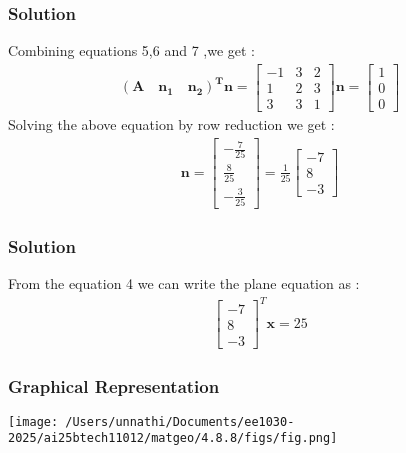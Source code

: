 \documentclass{beamer}
\begin{document}
\begin{frame}
\frametitle{Solution}
Combining equations 5,6 and 7 ,we get :
\begin{align}
    \mathbf{(A\quad n_1\quad n_2)^{T}}\textbf{n} = \begin{bmatrix}-1 & 3& 2\\
                                                      1 & 2 & 3\\
                                                      3 & 3& 1\end{bmatrix}\textbf{n} = \begin{bmatrix}1\\0\\0\end{bmatrix}
\end{align}
Solving the above equation by row reduction we get :
\begin{align}
    \textbf{n} = \begin{bmatrix}-\frac{7}{25} \\ \frac{8}{25} \\ -\frac{3}{25}\end{bmatrix} = \frac{1}{25}\begin{bmatrix}-7\\8\\-3\end{bmatrix}
\end{align}

\end{frame}

\begin{frame}
\frametitle{Solution}
From the equation 4 we can write the plane equation as :
\begin{align}
    \begin{bmatrix}-7\\8\\-3\end{bmatrix}^{T}\textbf{x} = 25
\end{align}

\end{frame}
\begin{frame}

\frametitle{Graphical Representation}
\begin{center}
\texttt{[image: /Users/unnathi/Documents/ee1030-2025/ai25btech11012/matgeo/4.8.8/figs/fig.png]}
\end{center}
\end{frame}
\end{document}
